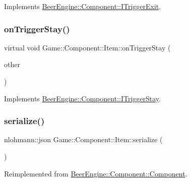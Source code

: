 Implements \mbox{\hyperlink{class_beer_engine_1_1_component_1_1_i_trigger_exit_ad5bc744f738cb2c52de40b243954967f}{Beer\+Engine\+::\+Component\+::\+I\+Trigger\+Exit}}.

\mbox{\label{class_game_1_1_component_1_1_item_a02230f3771a83e4a77035cb0ec4c04be}} 
\subsubsection{\texorpdfstring{on\+Trigger\+Stay()}{onTriggerStay()}}
{\footnotesize\ttfamily virtual void Game\+::\+Component\+::\+Item\+::on\+Trigger\+Stay (\begin{DoxyParamCaption}\item[{\mbox{\hyperlink{class_beer_engine_1_1_component_1_1_a_collider}{Beer\+Engine\+::\+Component\+::\+A\+Collider}} $\ast$}]{other }\end{DoxyParamCaption})\hspace{0.3cm}{\ttfamily [virtual]}}



Implements \mbox{\hyperlink{class_beer_engine_1_1_component_1_1_i_trigger_stay_ae0b762108ab5484071657e13f7a2cbd7}{Beer\+Engine\+::\+Component\+::\+I\+Trigger\+Stay}}.

\mbox{\label{class_game_1_1_component_1_1_item_a8aae88fd10b852e81fbaa16b5912a4ab}} 
\subsubsection{\texorpdfstring{serialize()}{serialize()}}
{\footnotesize\ttfamily nlohmann\+::json Game\+::\+Component\+::\+Item\+::serialize (\begin{DoxyParamCaption}{ }\end{DoxyParamCaption})\hspace{0.3cm}{\ttfamily [virtual]}}



Reimplemented from \mbox{\hyperlink{class_beer_engine_1_1_component_1_1_component_a4d82d8a6b22b93514e0585fa4073041f}{Beer\+Engine\+::\+Component\+::\+Component}}.

